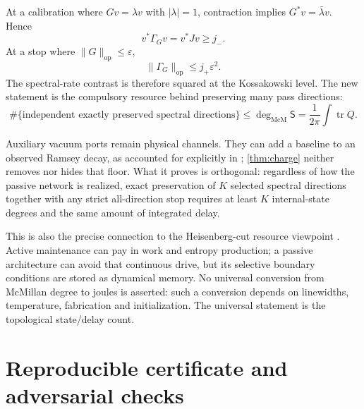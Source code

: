 \documentclass[11pt]{article}
\theoremstyle{definition}
\theoremstyle{remark}
\newcommand{\tr}{\operatorname{tr}}
\newcommand{\op}{\mathrm{op}}
\newcommand{\mcdeg}{\deg_{\mathrm{McM}}}
\begin{document}
At a calibration where $Gv=\lambda v$ with $|\lambda|=1$, contraction implies
$G^*v=\bar\lambda v$.  Hence
\begin{equation}\label{eq:passrate}
 v^*\Gamma_Gv=v^*Jv\geq j_-.
\end{equation}
At a stop where $\|G\|_{\op}\leq\varepsilon$,
\begin{equation}\label{eq:stoprate}
 \|\Gamma_G\|_{\op}\leq j_+\varepsilon^2.
\end{equation}
The spectral-rate contrast is therefore squared at the Kossakowski level.
The new statement is the compulsory resource behind preserving many pass
directions:
\begin{equation}\label{eq:quantummemory}
 \#\{\text{independent exactly preserved spectral directions}\}
 \leq \mcdeg\mathsf S
 =\frac1{2\pi}\int\tr Q.
\end{equation}

Auxiliary vacuum ports remain physical channels.  They can add a baseline to
an observed Ramsey decay, as accounted for explicitly in
\cite{ErikssonReservoir2026}; \cref{thm:charge} neither removes nor hides that
floor.  What it proves is orthogonal: regardless of how the passive network is
realized, exact preservation of $K$ selected spectral directions together
with any strict all-direction stop requires at least $K$ internal-state
degrees and the same amount of integrated delay.

This is also the precise connection to the Heisenberg-cut resource viewpoint
\cite{ErikssonCut2026}.  Active maintenance can pay in work and entropy
production; a passive architecture can avoid that continuous drive, but its
selective boundary conditions are stored as dynamical memory.  No universal
conversion from McMillan degree to joules is asserted: such a conversion
depends on linewidths, temperature, fabrication and initialization.  The
universal statement is the topological state/delay count.

\section{Reproducible certificate and adversarial checks}
\end{document}

